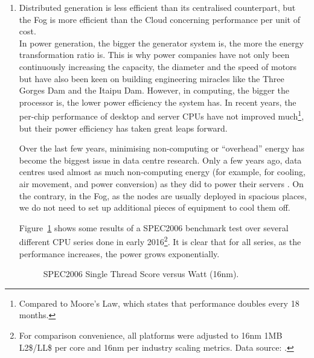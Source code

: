 \begin{enumerate}
	\item Distributed generation is less efficient than its centralised counterpart, but the Fog is more efficient than the Cloud concerning performance per unit of cost.\\
	In power generation, the bigger the generator system is, the more the energy transformation ratio is. 
	This is why power companies have not only been continuously increasing the capacity, the diameter and the speed of motors but have also been keen on building engineering miracles like the Three Gorges Dam and the Itaipu Dam. 
	However, in computing, the bigger the processor is, the lower power efficiency the system has. In recent years, the per-chip performance of desktop and server CPUs have not improved much\footnote{Compared to Moore's Law, which states that performance doubles every 18 months.}, but their power efficiency has taken great leaps forward. 
	
	Over the last few years, minimising non-computing or ``overhead'' energy has become the biggest issue in data centre research. Only a few years ago, data centres used almost as much non-computing energy (for example, for cooling, air movement, and power conversion) as they did to power their servers \cite{Weihl:2011:SDC}. On the contrary, in the Fog, as the nodes are usually deployed in spacious places, we do not need to set up additional pieces of equipment to cool them off. 
	
	Figure~\ref{fig:spec-performance-power} shows some results of a SPEC2006 benchmark test over several different CPU series done in early 2016\footnote{For comparison convenience, all platforms were adjusted to 16nm 1MB L2\$/LL\$ per core and 16nm per industry scaling metrics. Data source: \cite{soft-visc}.}. It is clear that for all series, as the performance increases, the power grows exponentially. 
	\begin{figure}[ht] 
		\centering 
		
		\caption{SPEC2006 Single Thread Score versus Watt (16nm).} 
		\label{fig:spec-performance-power} 
	\end{figure}
	

\end{enumerate}
